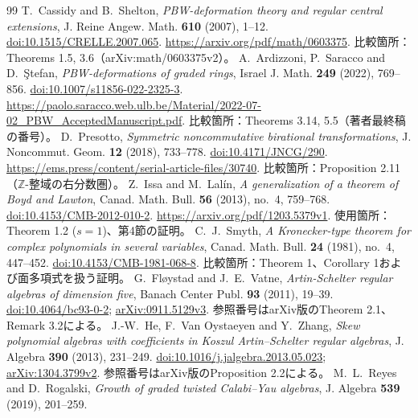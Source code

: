 \documentclass[11pt,a4paper]{ltjsarticle}
\theoremstyle{definition}
\begin{document}
\begingroup
\small
\begin{thebibliography}{99}
T.~Cassidy and B.~Shelton,
\emph{PBW-deformation theory and regular central extensions},
J. Reine Angew. Math. \textbf{610} (2007), 1--12.
\href{https://doi.org/10.1515/CRELLE.2007.065}{doi:10.1515/CRELLE.2007.065}.
\url{https://arxiv.org/pdf/math/0603375}.
比較箇所：Theorems 1.5, 3.6（arXiv:math/0603375v2）。
A.~Ardizzoni, P.~Saracco and D.~\c{S}tefan,
\emph{PBW-deformations of graded rings},
Israel J. Math. \textbf{249} (2022), 769--856.
\href{https://doi.org/10.1007/s11856-022-2325-3}{doi:10.1007/s11856-022-2325-3}.
\url{https://paolo.saracco.web.ulb.be/Material/2022-07-02_PBW_AcceptedManuscript.pdf}.
比較箇所：Theorems 3.14, 5.5（著者最終稿の番号）。
D.~Presotto, \emph{Symmetric noncommutative birational transformations},
J. Noncommut. Geom. \textbf{12} (2018), 733--778.
\href{https://doi.org/10.4171/JNCG/290}{doi:10.4171/JNCG/290}.
\url{https://ems.press/content/serial-article-files/30740}.
比較箇所：Proposition 2.11（$\mathbb Z$-整域の右分数圏）。
Z.~Issa and M.~Lal\'in,
\emph{A generalization of a theorem of Boyd and Lawton},
Canad. Math. Bull. \textbf{56} (2013), no.~4, 759--768.
\href{https://doi.org/10.4153/CMB-2012-010-2}{doi:10.4153/CMB-2012-010-2}.
\url{https://arxiv.org/pdf/1203.5379v1}.
使用箇所：Theorem 1.2 ($s=1$)、第4節の証明。
C.~J.~Smyth,
\emph{A Kronecker-type theorem for complex polynomials in several variables},
Canad. Math. Bull. \textbf{24} (1981), no.~4, 447--452.
\href{https://doi.org/10.4153/CMB-1981-068-8}{doi:10.4153/CMB-1981-068-8}.
比較箇所：Theorem 1、Corollary 1および面多項式を扱う証明。
G.~Fl\o ystad and J.~E.~Vatne,
\emph{Artin-Schelter regular algebras of dimension five},
Banach Center Publ. \textbf{93} (2011), 19--39.
\href{https://doi.org/10.4064/bc93-0-2}{doi:10.4064/bc93-0-2};
\href{https://arxiv.org/abs/0911.5129v3}{arXiv:0911.5129v3}.
参照番号はarXiv版のTheorem 2.1、Remark 3.2による。
J.-W.~He, F.~Van Oystaeyen and Y.~Zhang,
\emph{Skew polynomial algebras with coefficients in Koszul Artin--Schelter regular algebras},
J. Algebra \textbf{390} (2013), 231--249.
\href{https://doi.org/10.1016/j.jalgebra.2013.05.023}{doi:10.1016/j.jalgebra.2013.05.023};
\href{https://arxiv.org/abs/1304.3799v2}{arXiv:1304.3799v2}.
参照番号はarXiv版のProposition 2.2による。
M.~L.~Reyes and D.~Rogalski,
\emph{Growth of graded twisted Calabi--Yau algebras},
J. Algebra \textbf{539} (2019), 201--259.

\end{thebibliography}
\end{document}
